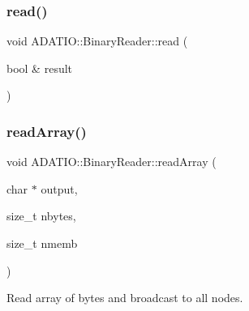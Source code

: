 \mbox{\label{classADATIO_1_1BinaryReader_aa4339bc0d5545d2697e498b6da4118a7}} 
\subsubsection{\texorpdfstring{read()}{read()}\hspace{0.1cm}{\footnotesize\ttfamily [33/33]}}
{\footnotesize\ttfamily void A\+D\+A\+T\+I\+O\+::\+Binary\+Reader\+::read (\begin{DoxyParamCaption}\item[{bool \&}]{result }\end{DoxyParamCaption})\hspace{0.3cm}{\ttfamily [virtual]}}

\mbox{\label{classADATIO_1_1BinaryReader_a9c68e2d4ecd86773a48a3a38f0c90677}} 
\subsubsection{\texorpdfstring{readArray()}{readArray()}\hspace{0.1cm}{\footnotesize\ttfamily [1/3]}}
{\footnotesize\ttfamily void A\+D\+A\+T\+I\+O\+::\+Binary\+Reader\+::read\+Array (\begin{DoxyParamCaption}\item[{char $\ast$}]{output,  }\item[{size\+\_\+t}]{nbytes,  }\item[{size\+\_\+t}]{nmemb }\end{DoxyParamCaption})\hspace{0.3cm}{\ttfamily [virtual]}}



Read array of bytes and broadcast to all nodes. 


